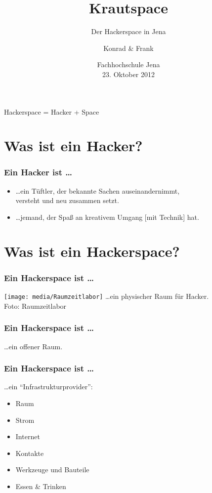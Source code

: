 \documentclass[english,compress,handout]{beamer}
\title{Krautspace}
\subtitle{Der Hackerspace in Jena}
\author[Schöbel]{Konrad \& Frank}
\institute[Hackspace Jena]{Hackspace Jena}
\date[23/10/2012]{Fachhochschule Jena \\ 23. Oktober 2012}
\begin{document}
\begin{center}

\begin{frame}
	\titlepage
\end{frame}

\begin{frame}
	\Large Hackerspace \quad = \quad Hacker \quad + \quad Space
\end{frame}

\section{Was ist ein Hacker?}

\begin{frame}
	\frametitle{Ein Hacker ist \ldots}
	\begin{itemize}
		\item \ldots ein Tüftler, der bekannte Sachen auseinandernimmt, \\
			versteht und neu zusammen setzt. \bigskip\\
		\item \ldots jemand, der Spaß an kreativem Umgang [mit Technik] hat.
	\end{itemize}
\end{frame}

\section{Was ist ein Hackerspace?}

\begin{frame}
	\frametitle{Ein Hackerspace ist \ldots}
	\vfill
	\texttt{[image: media/Raumzeitlabor]}
	\vfill
	\ldots ein physischer Raum für Hacker.\\
	\hfill
	\tiny{Foto: Raumzeitlabor}
\end{frame}

\begin{frame}
	\frametitle{Ein Hackerspace ist \ldots}
	\ldots ein offener Raum.
\end{frame}

\begin{frame}
	\frametitle{Ein Hackerspace ist \ldots}
	\ldots ein "`Infrastrukturprovider"':
	\vfill
	\begin{itemize}
		\item Raum
		\item Strom
		\item Internet
		\item Kontakte
		\item Werkzeuge und Bauteile
		\item Essen \& Trinken
	\end{itemize}
\end{frame}


\end{center}
\end{document}
